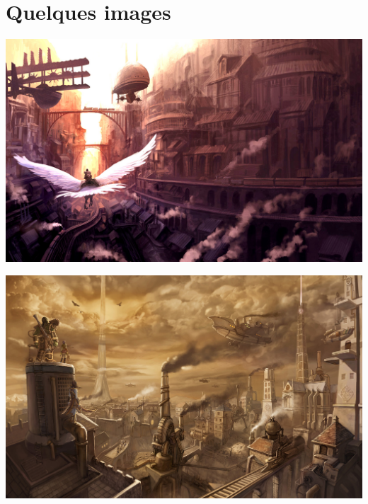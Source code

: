 \section*{Quelques images}
\begin{minipage}{.49\textwidth}
\includegraphics[width=\linewidth]{./images/Annexes/Above-the-city-steampunk-wallpaper.jpg}
\\[-1mm]
\end{minipage}
\hspace{.02\textwidth}
\begin{minipage}{.49\textwidth}
\includegraphics[width=\linewidth]{./images/Annexes/city-of-steam-steampunk.jpg}
\\[-1mm]
\end{minipage}

